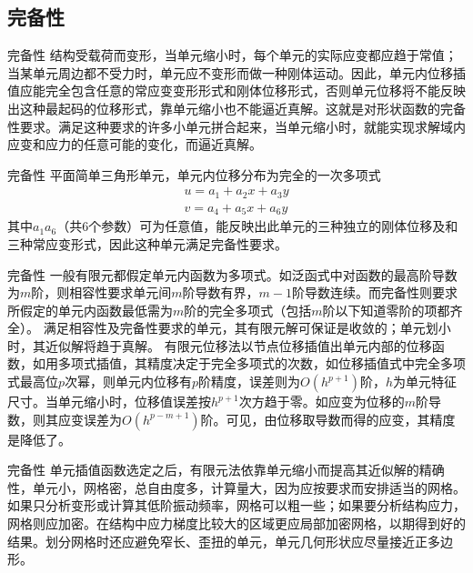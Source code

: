 \documentclass[11pt]{beamer}
\begin{document}
\subsection{完备性}
\begin{frame}{完备性}	
结构受载荷而变形，当单元缩小时，每个单元的实际应变都应趋于常值；当某单元周边都不受力时，单元应不变形而做一种刚体运动。因此，单元内位移插值应能完全包含任意的常应变变形形式和刚体位移形式，否则单元位移将不能反映出这种最起码的位移形式，靠单元缩小也不能逼近真解。这就是对形状函数的完备性要求。满足这种要求的许多小单元拼合起来，当单元缩小时，就能实现求解域内应变和应力的任意可能的变化，而逼近真解。
\end{frame}

\begin{frame}{完备性}
平面简单三角形单元，单元内位移分布为完全的一次多项式
\begin{align*}
u=a_{1}+a_{2}x+a_{3}y\\
v=a_{4}+a_{5}x+a_{6}y
\end{align*}
其中$a_{1}a_{6}$（共6个参数）可为任意值，能反映出此单元的三种独立的刚体位移及和三种常应变形式，因此这种单元满足完备性要求。
\end{frame}


\begin{frame}{完备性}
一般有限元都假定单元内函数为多项式。如泛函式中对函数的最高阶导数为$m$阶，则相容性要求单元间$m$阶导数有界，$m-1$阶导数连续。而完备性则要求所假定的单元内函数最低需为$m$阶的完全多项式（包括$m$阶以下知道零阶的项都齐全）。
满足相容性及完备性要求的单元，其有限元解可保证是收敛的；单元划小时，其近似解将趋于真解。
有限元位移法以节点位移插值出单元内部的位移函数，如用多项式插值，其精度决定于完全多项式的次数，如位移插值式中完全多项式最高位$p$次幂，则单元内位移有$p$阶精度，误差则为$O(h^{p+1})$阶，$h$为单元特征尺寸。当单元缩小时，位移值误差按$h^{p+1}$次方趋于零。如应变为位移的$m$阶导数，则其应变误差为$O(h^{p-m+1})$阶。可见，由位移取导数而得的应变，其精度是降低了。
\end{frame}


\begin{frame}{完备性}
单元插值函数选定之后，有限元法依靠单元缩小而提高其近似解的精确性，单元小，网格密，总自由度多，计算量大，因为应按要求而安排适当的网格。如果只分析变形或计算其低阶振动频率，网格可以粗一些；如果要分析结构应力，网格则应加密。在结构中应力梯度比较大的区域更应局部加密网格，以期得到好的结果。划分网格时还应避免窄长、歪扭的单元，单元几何形状应尽量接近正多边形。
\end{frame}
\end{document}
